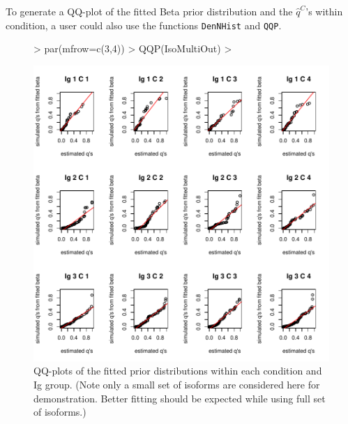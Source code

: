 \documentclass{article}
\begin{document}
\noindent To generate a QQ-plot of the fitted Beta prior distribution 
and the $\hat{q}^C$'s within condition, a user could also use the functions 
\verb+DenNHist+ and \verb+QQP+.
\newpage
\begin{figure}[h!]
\centering
\begin{Schunk}
\begin{Sinput}
> par(mfrow=c(3,4))
> QQP(IsoMultiOut)
> 
\end{Sinput}
\end{Schunk}
\includegraphics{EBSeq_Vignette-046}
\caption{ QQ-plots of the fitted prior distributions within each condition and Ig group. 
(Note only a small set of isoforms are considered here for demonstration.
Better fitting should be expected while using full set of isoforms.)}
\label{fig:IsoMultiQQ}
\end{figure}
\end{document}
